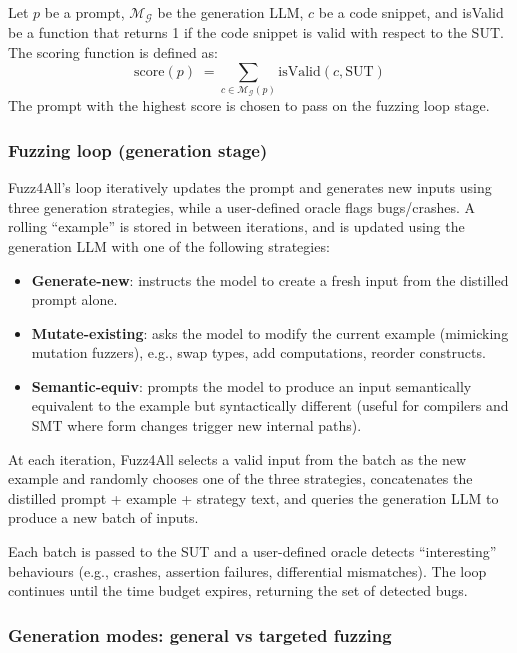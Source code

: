 Let $p$ be a prompt, $\mathcal{M_G}$ be the generation LLM, $c$ be a code snippet, and isValid be a function that returns 1 if the code snippet is valid with respect to the SUT. The scoring function is defined as:
\[
\text{score}(p) \;= \sum_{c \in \mathcal{M_G}(p)} \text{isValid}(c,\text{SUT})
\]
The prompt with the highest score is chosen to pass on the fuzzing loop stage.


\subsubsection{Fuzzing loop (generation stage)}

Fuzz4All's loop iteratively updates the prompt and generates new inputs using three generation strategies, while a user-defined oracle flags bugs/crashes. A rolling ``example'' is stored in between iterations, and is updated using the generation LLM with one of the following strategies:

\begin{itemize}
    \item \textbf{Generate-new}: instructs the model to create a fresh input from the distilled prompt alone.
    \item \textbf{Mutate-existing}: asks the model to modify the current example (mimicking mutation fuzzers), e.g., swap types, add computations, reorder constructs.
    \item \textbf{Semantic-equiv}: prompts the model to produce an input semantically equivalent to the example but syntactically different (useful for compilers and SMT where form changes trigger new internal paths).
\end{itemize}

At each iteration, Fuzz4All selects a valid input from the batch as the new example and randomly chooses one of the three strategies, concatenates the distilled prompt + example + strategy text, and queries the generation LLM to produce a new batch of inputs.

Each batch is passed to the SUT and a user-defined oracle detects ``interesting'' behaviours (e.g., crashes, assertion failures, differential mismatches). The loop continues until the time budget expires, returning the set of detected bugs.

\subsubsection{Generation modes: general vs targeted fuzzing}

